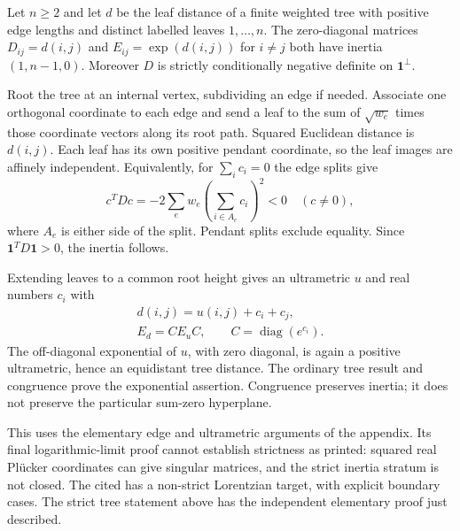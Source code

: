 \begin{theorem}
\label{thm:appH-triangular-tree-inertia}
Let $n\geq2$ and let $d$ be the leaf distance of a finite
weighted tree with positive edge lengths and distinct
labelled leaves $1,\ldots,n$. The zero-diagonal matrices
$D_{ij}=d(i,j)$ and $E_{ij}=\exp(d(i,j))$ for $i\ne j$
both have inertia $(1,n-1,0)$. Moreover $D$ is strictly
conditionally negative definite on $\mathbf1^\perp$.
\end{theorem}

Root the tree at an internal vertex, subdividing an edge
if needed. Associate one orthogonal coordinate to each edge
and send a leaf to the sum of $\sqrt{w_e}$ times those
coordinate vectors along its root path. Squared Euclidean
distance is $d(i,j)$. Each leaf has its own positive pendant
coordinate, so the leaf images are affinely independent.
Equivalently, for $\sum_i c_i=0$ the edge splits give
\begin{equation*}
 c^TDc=-2\sum_e w_e\left(\sum_{i\in A_e}c_i\right)^2<0
           \quad(c\ne0),
 \tag{H.108}\label{eq:appH-triangular-tree-energy}
\end{equation*}
where $A_e$ is either side of the split. Pendant splits
exclude equality. Since $\mathbf1^TD\mathbf1>0$, the
inertia follows.

Extending leaves to a common root height gives an ultrametric
$u$ and real numbers $c_i$ with
\begin{equation*}
 \begin{gathered}
 d(i,j)=u(i,j)+c_i+c_j,\\
 E_d=CE_uC,\qquad C=\operatorname{diag}(e^{c_i}).
 \end{gathered}
 \tag{H.109}\label{eq:appH-triangular-tree-congruence}
\end{equation*}
The off-diagonal exponential of $u$, with zero diagonal,
is again a positive ultrametric, hence an equidistant tree
distance. The ordinary tree result and congruence prove
the exponential assertion. Congruence preserves inertia;
it does not preserve the particular sum-zero hyperplane.

This uses the elementary edge and ultrametric arguments of
the appendix. Its final logarithmic-limit proof cannot
establish strictness as printed: squared real Pl\"ucker
coordinates can give singular matrices, and the strict
inertia stratum is not closed. The cited
\cite[Theorem~5.1]{BakerHuhKummerLorscheid25TopologicalV3}
has a non-strict Lorentzian target, with explicit boundary
cases. The strict tree statement above has the independent
elementary proof just described.

